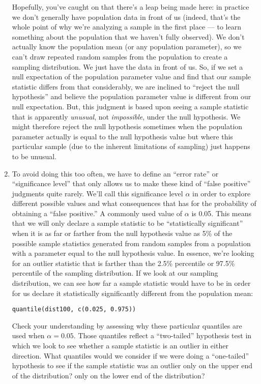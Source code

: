\documentclass[a4paper,12pt]{article}
\begin{document}
\begin{enumerate}
\vspace{4em}

\noindent Hopefully, you've caught on that there's a leap being made here: in practice we don't generally have population data in front of us (indeed, that's the whole point of why we're analyzing a sample in the first place --- to learn something about the population that we haven't fully observed). We don't actually know the population mean (or any population parameter), so we can't draw repeated random samples from the population to create a sampling distribution. We just have the data in front of us. So, if we set a null expectation of the population parameter value and find that our sample statistic differs from that considerably, we are inclined to ``reject the null hypothesis'' and believe the population parameter value is different from our null expectation. But, this judgment is based upon seeing a sample statistic that is apparently \textit{unusual}, not \textit{impossible}, under the null hypothesis. We might therefore reject the null hypothesis sometimes when the population parameter actually is equal to the null hypothesis value but where this particular sample (due to the inherent limitations of sampling) just happens to be unusual. 

\item To avoid doing this too often, we have to define an ``error rate'' or ``significance level'' that only allows us to make these kind of ``false positive'' judgments quite rarely. We'll call this significance level $\alpha$ in order to explore different possible values and what consequences that has for the probability of obtaining a ``false positive.'' A commonly used value of $\alpha$ is 0.05. This means that we will only declare a sample statistic to be ``statistically significant'' when it is as far or farther from the null hypothesis value as 5\% of the possible sample statistics generated from random samples from a population with a parameter equal to the null hypothesis value. In essence, we're looking for an outlier statistic that is farther than the 2.5\% percentile or 97.5\% percentile of the sampling distribution. If we look at our sampling distribution, we can see how far a sample statistic would have to be in order for us declare it statistically significantly different from the population mean:

\begin{verbatim}
quantile(dist100, c(0.025, 0.975))
\end{verbatim}

\noindent Check your understanding by assessing why these particular quantiles are used when $\alpha = 0.05$. Those quantiles reflect a ``two-tailed'' hypothesis test in which we look to see whether a sample statistic is an outlier in either direction. What quantiles would we consider if we were doing a ``one-tailed'' hypothesis to see if the sample statistic was an outlier only on the upper end of the distribution? only on the lower end of the distribution?


\end{enumerate}
\end{document}
